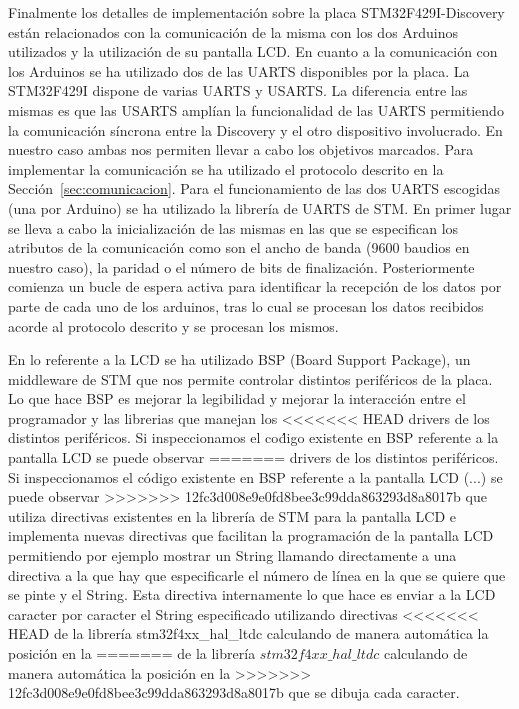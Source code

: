 Finalmente los detalles de implementaci\'on sobre la placa
STM32F429I-Discovery est\'an relacionados con la comunicaci\'on de la
misma con los dos Arduinos utilizados y la utilizaci\'on de su
pantalla LCD. En cuanto a la comunicaci\'on con los Arduinos se ha
utilizado dos de las UARTS disponibles por la placa. La STM32F429I
dispone de varias UARTS y USARTS. La diferencia entre las mismas es
que las USARTS ampl\'ian la funcionalidad de las UARTS permitiendo la
comunicaci\'on s\'incrona entre la Discovery y el otro dispositivo
involucrado. En nuestro caso ambas nos permiten
llevar a cabo los objetivos marcados. Para implementar la
comunicaci\'on se ha utilizado el protocolo descrito en la
Secci\'on~\ref{sec:comunicacion}. Para el funcionamiento de las dos
UARTS escogidas (una por Arduino) se ha utilizado la librer\'ia de UARTS
de STM. En primer lugar se lleva a cabo la inicializaci\'on de las
mismas en las que se especifican los atributos de la comunicaci\'on
como son el ancho de banda (9600 baudios en nuestro caso), la paridad
o el n\'umero de bits de finalizaci\'on. Posteriormente comienza un
bucle de espera activa para identificar la recepci\'on de los datos
por parte de cada uno de los arduinos, tras lo cual se procesan los
datos recibidos acorde al protocolo descrito y se procesan los mismos.

En lo referente a la LCD se ha utilizado BSP (Board Support Package),
un middleware de STM que nos permite controlar distintos perif\'ericos
de la placa. Lo que hace BSP es mejorar la legibilidad y mejorar la
interacci\'on entre el programador y las librerias que manejan los
<<<<<<< HEAD
drivers de los distintos perif\'ericos. Si inspeccionamos el co\'digo
existente en BSP referente a la pantalla LCD se puede observar
=======
drivers de los distintos perif\'ericos. Si inspeccionamos el c\'odigo
existente en BSP referente a la pantalla LCD (...) se puede observar
>>>>>>> 12fc3d008e9e0fd8bee3c99dda863293d8a8017b
que utiliza directivas existentes en la librer\'ia de
STM para la pantalla LCD e implementa nuevas directivas que facilitan
la programaci\'on de la pantalla LCD permitiendo por ejemplo mostrar
un String llamando directamente a una directiva a la que hay que
especificarle el n\'umero de l\'inea en la que se quiere que se pinte
y el String. Esta directiva internamente lo que hace es enviar a la
LCD caracter por caracter el String especificado utilizando directivas
<<<<<<< HEAD
de la librer\'ia stm32f4xx\_hal\_ltdc calculando de manera autom\'atica la posici\'on en la
=======
de la librer\'ia $stm32f4xx\_hal\_ltdc$ calculando de manera autom\'atica la posici\'on en la
>>>>>>> 12fc3d008e9e0fd8bee3c99dda863293d8a8017b
que se dibuja cada caracter.


